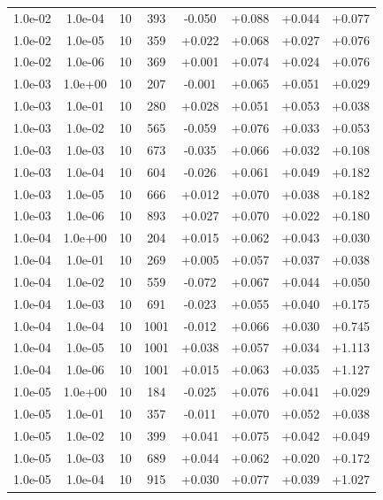 \documentclass[11pt,a4paper]{article}
\begin{document}
\begin{table}
{\begin{tabular}{*{8}c}
 1.0e-02 	 & 1.0e-04 	 & 10 & 393 	 & -0.050 & +0.088 & +0.044 & +0.077 \\ 
 1.0e-02 	 & 1.0e-05 	 & 10 & 359 	 & +0.022 & +0.068 & +0.027 & +0.076 \\ 
 1.0e-02 	 & 1.0e-06 	 & 10 & 369 	 & +0.001 & +0.074 & +0.024 & +0.076 \\ 
 1.0e-03 	 & 1.0e+00 	 & 10 & 207 	 & -0.001 & +0.065 & +0.051 & +0.029 \\ 
 1.0e-03 	 & 1.0e-01 	 & 10 & 280 	 & +0.028 & +0.051 & +0.053 & +0.038 \\ 
 1.0e-03 	 & 1.0e-02 	 & 10 & 565 	 & -0.059 & +0.076 & +0.033 & +0.053 \\ 
 1.0e-03 	 & 1.0e-03 	 & 10 & 673 	 & -0.035 & +0.066 & +0.032 & +0.108 \\ 
 1.0e-03 	 & 1.0e-04 	 & 10 & 604 	 & -0.026 & +0.061 & +0.049 & +0.182 \\ 
 1.0e-03 	 & 1.0e-05 	 & 10 & 666 	 & +0.012 & +0.070 & +0.038 & +0.182 \\ 
 1.0e-03 	 & 1.0e-06 	 & 10 & 893 	 & +0.027 & +0.070 & +0.022 & +0.180 \\ 
 1.0e-04 	 & 1.0e+00 	 & 10 & 204 	 & +0.015 & +0.062 & +0.043 & +0.030 \\ 
 1.0e-04 	 & 1.0e-01 	 & 10 & 269 	 & +0.005 & +0.057 & +0.037 & +0.038 \\ 
 1.0e-04 	 & 1.0e-02 	 & 10 & 559 	 & -0.072 & +0.067 & +0.044 & +0.050 \\ 
 1.0e-04 	 & 1.0e-03 	 & 10 & 691 	 & -0.023 & +0.055 & +0.040 & +0.175 \\ 
\rowcolor{red}  1.0e-04 	 & 1.0e-04 	 & 10 & 1001 	 & -0.012 & +0.066 & +0.030 & +0.745 \\ 
\rowcolor{red}  1.0e-04 	 & 1.0e-05 	 & 10 & 1001 	 & +0.038 & +0.057 & +0.034 & +1.113 \\ 
\rowcolor{red} 1.0e-04 	 & 1.0e-06 	 & 10 & 1001 	 & +0.015 & +0.063 & +0.035 & +1.127 \\ 
 1.0e-05 	 & 1.0e+00 	 & 10 & 184 	 & -0.025 & +0.076 & +0.041 & +0.029 \\ 
 1.0e-05 	 & 1.0e-01 	 & 10 & 357 	 & -0.011 & +0.070 & +0.052 & +0.038 \\ 
 1.0e-05 	 & 1.0e-02 	 & 10 & 399 	 & +0.041 & +0.075 & +0.042 & +0.049 \\ 
 1.0e-05 	 & 1.0e-03 	 & 10 & 689 	 & +0.044 & +0.062 & +0.020 & +0.172 \\ 
\rowcolor{red} 1.0e-05 	 & 1.0e-04 	 & 10 & 915 	 & +0.030 & +0.077 & +0.039 & +1.027 \\ 

\end{tabular}}
\end{table}
\end{document}
